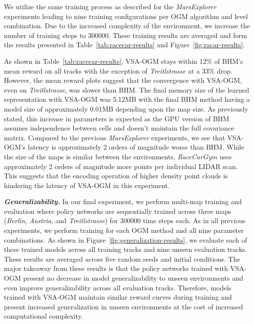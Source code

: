We utilize the same training process as described for the \textit{MarsExplorer} experiments leading to nine training configurations per OGM algorithm and level combination. Due to the increased complexity of the environment, we increase the number of training steps to 300000. These training results are averaged and form the results presented in Table~\ref{tab:racecar-results} and Figure~\ref{fig:racar-results}.

As shown in Table~\ref{tab:racecar-results}, VSA-OGM stays within 12\% of BHM's mean reward on all tracks with the exception of \textit{Treitlstrasse} at a 33\% drop. However, the mean reward plots suggest that the convergence with VSA-OGM, even on \textit{Treitlstrasse}, was slower than BHM. 
The final memory size of the learned representation with VSA-OGM was 5.12MB with the final BHM method having a model size of approximately 0.01MB depending upon the map size. As previously stated, this increase in parameters is expected as the GPU version of BHM assumes independence between cells and doesn't maintain the full covariance matrix. Compared to the previous \textit{MarsExplorer} experiments, we see that VSA-OGM's latency is approximately 2 orders of magnitude worse than BHM. While the size of the maps is similar between the environments, \textit{RaceCarGym} uses approximately 2 orders of magnitude more points per individual LIDAR scan. This suggests that the encoding operation of higher density point clouds is hindering the latency of VSA-OGM in this experiment.

\textbf{\textit{Generalizability.}} In our final experiment, we perform multi-map training and evaluation where policy networks are sequentially trained across three maps (\textit{Berlin}, \textit{Austria}, and \textit{Treitlstrasse}) for 300000 time steps each. As in all previous experiments, we perform training for each OGM method and all nine parameter combinations. As shown in Figure~\ref{fig:generalization-results}, we evaluate each of these trained models across all training tracks and nine unseen evaluation tracks. These results are averaged across five random seeds and initial conditions. The major takeaway from these results is that the policy networks trained with VSA-OGM present no decrease in model generalizability to unseen environments and even improve generalizability across all evaluation tracks. Therefore, models trained with VSA-OGM maintain similar reward curves during training and present increased generalization in unseen environments at the cost of increased computational complexity.

